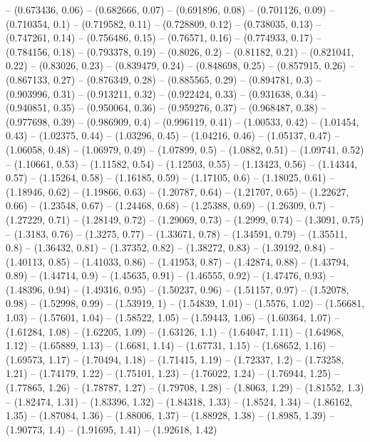 -- (0.673436, 0.06)
-- (0.682666, 0.07)
-- (0.691896, 0.08)
-- (0.701126, 0.09)
-- (0.710354, 0.1)
-- (0.719582, 0.11)
-- (0.728809, 0.12)
-- (0.738035, 0.13)
-- (0.747261, 0.14)
-- (0.756486, 0.15)
-- (0.76571, 0.16)
-- (0.774933, 0.17)
-- (0.784156, 0.18)
-- (0.793378, 0.19)
-- (0.8026, 0.2)
-- (0.81182, 0.21)
-- (0.821041, 0.22)
-- (0.83026, 0.23)
-- (0.839479, 0.24)
-- (0.848698, 0.25)
-- (0.857915, 0.26)
-- (0.867133, 0.27)
-- (0.876349, 0.28)
-- (0.885565, 0.29)
-- (0.894781, 0.3)
-- (0.903996, 0.31)
-- (0.913211, 0.32)
-- (0.922424, 0.33)
-- (0.931638, 0.34)
-- (0.940851, 0.35)
-- (0.950064, 0.36)
-- (0.959276, 0.37)
-- (0.968487, 0.38)
-- (0.977698, 0.39)
-- (0.986909, 0.4)
-- (0.996119, 0.41)
-- (1.00533, 0.42)
-- (1.01454, 0.43)
-- (1.02375, 0.44)
-- (1.03296, 0.45)
-- (1.04216, 0.46)
-- (1.05137, 0.47)
-- (1.06058, 0.48)
-- (1.06979, 0.49)
-- (1.07899, 0.5)
-- (1.0882, 0.51)
-- (1.09741, 0.52)
-- (1.10661, 0.53)
-- (1.11582, 0.54)
-- (1.12503, 0.55)
-- (1.13423, 0.56)
-- (1.14344, 0.57)
-- (1.15264, 0.58)
-- (1.16185, 0.59)
-- (1.17105, 0.6)
-- (1.18025, 0.61)
-- (1.18946, 0.62)
-- (1.19866, 0.63)
-- (1.20787, 0.64)
-- (1.21707, 0.65)
-- (1.22627, 0.66)
-- (1.23548, 0.67)
-- (1.24468, 0.68)
-- (1.25388, 0.69)
-- (1.26309, 0.7)
-- (1.27229, 0.71)
-- (1.28149, 0.72)
-- (1.29069, 0.73)
-- (1.2999, 0.74)
-- (1.3091, 0.75)
-- (1.3183, 0.76)
-- (1.3275, 0.77)
-- (1.33671, 0.78)
-- (1.34591, 0.79)
-- (1.35511, 0.8)
-- (1.36432, 0.81)
-- (1.37352, 0.82)
-- (1.38272, 0.83)
-- (1.39192, 0.84)
-- (1.40113, 0.85)
-- (1.41033, 0.86)
-- (1.41953, 0.87)
-- (1.42874, 0.88)
-- (1.43794, 0.89)
-- (1.44714, 0.9)
-- (1.45635, 0.91)
-- (1.46555, 0.92)
-- (1.47476, 0.93)
-- (1.48396, 0.94)
-- (1.49316, 0.95)
-- (1.50237, 0.96)
-- (1.51157, 0.97)
-- (1.52078, 0.98)
-- (1.52998, 0.99)
-- (1.53919, 1)
-- (1.54839, 1.01)
-- (1.5576, 1.02)
-- (1.56681, 1.03)
-- (1.57601, 1.04)
-- (1.58522, 1.05)
-- (1.59443, 1.06)
-- (1.60364, 1.07)
-- (1.61284, 1.08)
-- (1.62205, 1.09)
-- (1.63126, 1.1)
-- (1.64047, 1.11)
-- (1.64968, 1.12)
-- (1.65889, 1.13)
-- (1.6681, 1.14)
-- (1.67731, 1.15)
-- (1.68652, 1.16)
-- (1.69573, 1.17)
-- (1.70494, 1.18)
-- (1.71415, 1.19)
-- (1.72337, 1.2)
-- (1.73258, 1.21)
-- (1.74179, 1.22)
-- (1.75101, 1.23)
-- (1.76022, 1.24)
-- (1.76944, 1.25)
-- (1.77865, 1.26)
-- (1.78787, 1.27)
-- (1.79708, 1.28)
-- (1.8063, 1.29)
-- (1.81552, 1.3)
-- (1.82474, 1.31)
-- (1.83396, 1.32)
-- (1.84318, 1.33)
-- (1.8524, 1.34)
-- (1.86162, 1.35)
-- (1.87084, 1.36)
-- (1.88006, 1.37)
-- (1.88928, 1.38)
-- (1.8985, 1.39)
-- (1.90773, 1.4)
-- (1.91695, 1.41)
-- (1.92618, 1.42)
